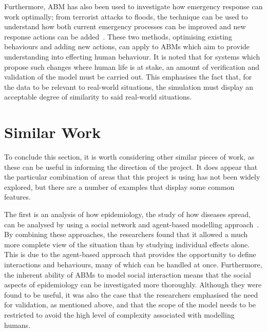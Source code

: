 \documentclass[]{report}
\begin{document}
Furthermore, ABM has also been used to investigate how emergency response can work optimally; from terrorist attacks to floods, the technique can be used to understand how both current emergency processes can be improved and new response actions can be added~\cite{emergency}. These two methods, optimising existing behaviours and adding new actions, can apply to ABMs which aim to provide understanding into effecting human behaviour. It is noted that for systems which propose such changes where human life is at stake, an amount of verification and validation of the model must be carried out. This emphasises the fact that, for the data to be relevant to real-world situations, the simulation must display an acceptable degree of similarity to said real-world situations.

\section{Similar Work}

To conclude this section, it is worth considering other similar pieces of work, as these can be useful in informing the direction of the project. It does appear that the particular combination of areas that this project is using has not been widely explored, but there are a number of examples that display some common features.

The first is an analysis of how epidemiology, the study of how diseases spread, can be analysed by using a social network and agent-based modelling approach~\cite{epid}. By combining these approaches, the researchers found that it allowed a much more complete view of the situation than by studying individual effects alone. This is due to the agent-based approach that provides the opportunity to define interactions and behaviours, many of which can be handled at once. Furthermore, the inherent ability of ABMs to model social interaction means that the social aspects of epidemiology can be investigated more thoroughly. Although they were found to be useful, it was also the case that the researchers emphasised the need for validation, as mentioned above, and that the scope of the model needs to be restricted to avoid the high level of complexity associated with modelling humans.
\end{document}
